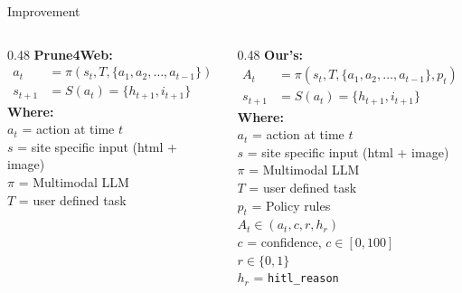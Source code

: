 \begin{frame}{Improvement}
  \begin{columns}[T]
    \begin{column}{0.48\textwidth}
      \textbf{Prune4Web:}
      \begin{align*}
        a_t &= \pi(s_t, T, \{a_1, a_2, \ldots, a_{t-1}\}) \\
        s_{t+1} &= S(a_t) = \{h_{t+1}, i_{t+1}\}
      \end{align*}
      \textbf{Where:}\\
      $a_t$ = action at time $t$\\
      $s$ = site specific input (html + image)\\
      $\pi$ = Multimodal LLM\\
      $T$ = user defined task
    \end{column}

    \begin{column}{0.48\textwidth}
      \textbf{Our's:}
      \begin{align*}
        A_t &= \pi(s_t, T, \{a_1, a_2, \ldots, a_{t-1}\}, p_t) \\
        s_{t+1} &= S(a_t) = \{h_{t+1}, i_{t+1}\}
      \end{align*}
      \textbf{Where:}\\
      $a_t$ = action at time $t$\\
      $s$ = site specific input (html + image)\\
      $\pi$ = Multimodal LLM\\
      $T$ = user defined task\\
      $p_t$ = Policy rules\\
      $A_t \in (a_t, c, r, h_r)$\\
      $c$ = confidence, $c \in [0,100]$\\
      $r \in \{0,1\}$\\
      $h_r$ = \texttt{hitl\_reason}
    \end{column}
  \end{columns}
\end{frame}
